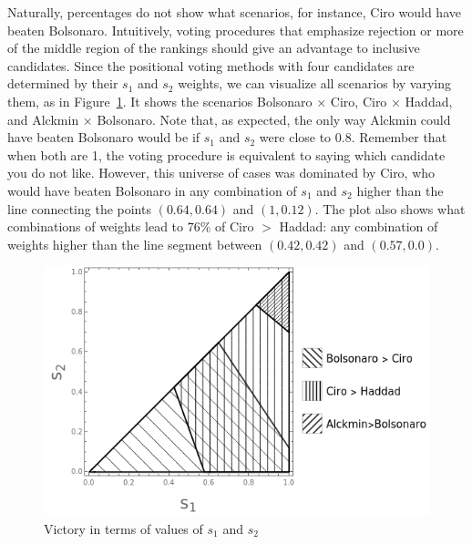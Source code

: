 \documentclass[hidelinks,11pt]{article}
\begin{document}
Naturally, percentages do not show what scenarios, for instance, Ciro would have beaten Bolsonaro. Intuitively, voting procedures that emphasize rejection or more of the middle region of the rankings should give an advantage to inclusive candidates. Since the positional voting methods with four candidates are determined by their \(s_{1}\) and \(s_{2}\) weights, we can visualize all scenarios by varying them,   as in Figure~\ref{fig:positional4c}. It shows the scenarios Bolsonaro \(\times\) Ciro, Ciro \(\times \) Haddad, and Alckmin \(\times\) Bolsonaro. Note that, as expected, the only way Alckmin could have beaten Bolsonaro would be if \(s_{1}\) and \(s_{2}\) were close to 0.8. Remember that when both are 1, the voting procedure is equivalent to saying which candidate you do not like. However, this universe of cases was dominated by Ciro, who would have beaten Bolsonaro in any combination of \(s_{1}\) and \(s_{2}\) higher than the line connecting the points \((0.64,0.64)\) and \((1,0.12)\). The plot also shows what combinations of weights lead to \(76\%\) of Ciro \(>\) Haddad: any combination of weights higher than the line segment between \((0.42,0.42)\) and \((0.57,0.0)\).

\begin{figure}[H]
 \centering
 \includegraphics[width=\columnwidth,
 height=0.3\textheight]{./images/positional_results.png}
\caption{Victory in terms of values of \(s_{1}\) and \(s_{2}\)}
 \label{fig:positional4c}
\end{figure}
\end{document}
